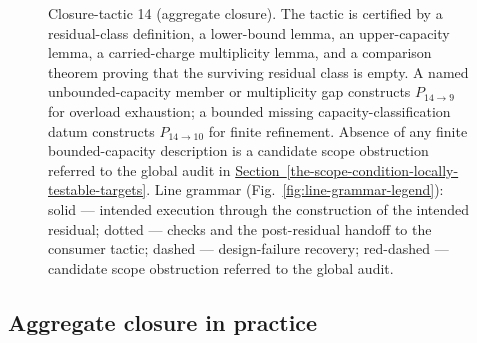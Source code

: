 \documentclass[
  11pt,
]{article}
\theoremstyle{definition}
\newcommand{\secref}[1]{\hyperref[#1]{Section~\ref*{#1}}}
\begin{document}
\begin{figure}[p]
{%
}
\caption[Closure-tactic 14: aggregate closure]{Closure-tactic 14 (aggregate closure).  The tactic is certified by a residual-class definition, a lower-bound lemma, an upper-capacity lemma, a carried-charge multiplicity lemma, and a comparison theorem proving that the surviving residual class is empty.  A named unbounded-capacity member or multiplicity gap constructs \(P_{14\to9}\) for overload exhaustion; a bounded missing capacity-classification datum constructs \(P_{14\to10}\) for finite refinement.  Absence of any finite bounded-capacity description is a candidate scope obstruction referred to the global audit in \secref{the-scope-condition-locally-testable-targets}.  Line grammar (Fig.~\ref{fig:line-grammar-legend}): solid --- intended execution through the construction of the intended residual; dotted --- checks and the post-residual handoff to the consumer tactic; dashed --- design-failure recovery; red-dashed --- candidate scope obstruction referred to the global audit.}
\label{fig:ct14-aggregate-closure}
\end{figure}
\FloatBarrier

\subsection*{Aggregate closure in practice}
\end{document}
